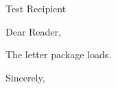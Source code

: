 \documentclass{letter}
\begin{document}
\begin{letter}{Test Recipient}
\opening{Dear Reader,}
The letter package loads.
\closing{Sincerely,}
\end{letter}
\end{document}
